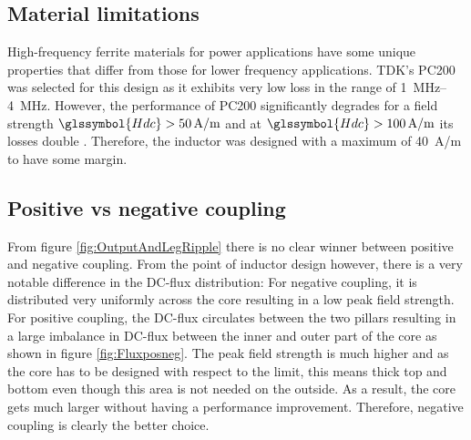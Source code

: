 \documentclass{IPEC2026}
\newcommand{\sbl}[1]{\glssymbol{#1}}
\begin{document}
\subsection{Material limitations}
High-frequency ferrite materials for power applications have some unique properties that differ from those for lower frequency applications. TDK's PC200 was selected for this design as it exhibits very low loss in the range of \qtyrange{1}{4}{\MHz}. However, the performance of PC200 significantly degrades for a field strength $\sbl{Hdc} > \qty{50}{A/m}$ and at $\sbl{Hdc} > \qty{100}{A/m}$ its losses double \cite{tdkHighFrequencyLowLossFerrite}. Therefore, the inductor was designed with a maximum \sbl{Hdc} of \qty{40}{A/m} to have some margin.

\subsection{Positive vs negative coupling}
From figure \ref{fig:OutputAndLegRipple} there is no clear winner between positive and negative coupling. From the point of inductor design however, there is a very notable difference in the DC-flux distribution: For negative coupling, it is distributed very uniformly across the core resulting in a low peak field strength. For positive coupling, the DC-flux circulates between the two pillars resulting in a large imbalance in DC-flux between the inner and outer part of the core as shown in figure \ref{fig:Fluxposneg}. The peak field strength is much higher and as the core has to be designed with respect to the \sbl{Hdc} limit, this means thick top and bottom even though this area is not needed on the outside. As a result, the core gets much larger without having a performance improvement. Therefore, negative coupling is clearly the better choice. \par  
\end{document}
